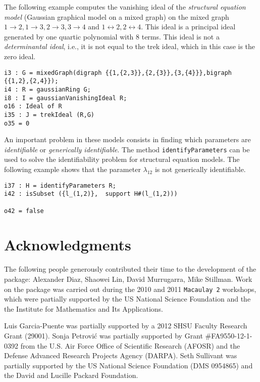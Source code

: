 \documentclass[letterpaper]{article}
\theoremstyle{definition}
\begin{document}
The following example computes the vanishing ideal of the \emph{structural
  equation model} (Gaussian graphical model on a mixed graph) on the mixed graph
$1\to 2, 1\to 3, 2\to 3, 3\to 4$ and $1 \leftrightarrow 2, 2 \leftrightarrow
4$. This ideal is a principal ideal generated by one quartic polynomial with 8
terms. This ideal is not a \emph{determinantal ideal}, i.e., it is not equal to
the trek ideal, which in this case is the zero ideal.


\begin{verbatim}
i3 : G = mixedGraph(digraph {{1,{2,3}},{2,{3}},{3,{4}}},bigraph {{1,2},{2,4}});
i4 : R = gaussianRing G;
i8 : I = gaussianVanishingIdeal R;
o16 : Ideal of R
i35 : J = trekIdeal (R,G)
o35 = 0
\end{verbatim}

An important problem in these models consists in finding which parameters are
\emph{identifiable} or \emph{generically identifiable}. The method
\texttt{identifyParameters} can be used to solve the identifiability problem for
structural equation models. The following example shows that the parameter
$\lambda_{12}$ is not generically identifiable. 

\begin{verbatim}
i37 : H = identifyParameters R;
i42 : isSubset ({l_(1,2)},  support H#(l_(1,2)))

o42 = false
\end{verbatim}


\section*{Acknowledgments }
The following people generously contributed their time to the
development of the package:  Alexander Diaz, Shaowei Lin, David Murrugarra, Mike 
Stillman.  Work on the package was carried out during the 2010 and 2011
{\tt Macaulay 2} workshops, which were partially supported by the US National 
Science Foundation and the the Institute for Mathematics and Its
Applications.

Luis Garcia-Puente was partially supported by a 2012 SHSU Faculty Research Grant (29001).
Sonja Petrovi\'c was partially supported by Grant \#FA9550-12-1-0392 from the U.S. Air Force Office of Scientific Research (AFOSR) and the Defense Advanced Research Projects Agency (DARPA).
Seth Sullivant was partially supported by the US National Science Foundation (DMS 0954865) and the David and Lucille Packard Foundation.
\end{document}
